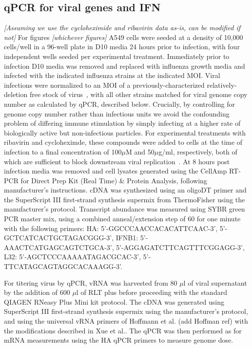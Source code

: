 \documentclass[9pt,lineno]{elife}
\newcommand{\abrcomment}[1]{\emph{\color{blue} [#1]}}
\begin{document}
\subsection{qPCR for viral genes and IFN}
\abrcomment{Assuming we use the cycloheximide and ribavirin data as-is, can be modified if not}
For figures \abrcomment{whichever figures} A549 cells were seeded at a density of 10,000 cells/well in a 96-well plate in D10 media 24 hours prior to infection, with four independent wells seeded per experimental treatment. 
Immediately prior to infection D10 media was removed and replaced with influenza growth media and infected with the indicated influenza strains at the indicated MOI.
Viral infections were normalized to an MOI of a previously-characterized relatively-deletion free stock of virus~\citep{russell2018extreme}, with all other strains matched for viral genome copy number as calculated by qPCR, described below.
Crucially, by controlling for genome copy number rather than infectious units we avoid the confounding problem of differing immune stimulation by simply infecting at a higher rate of biologically active but non-infectious particles.
For experimental treatments with ribavirin and cycloheximde, these compounds were added to cells at the time of infection to a final concentration of 100$\mu$M and 50$\mu$g/ml, respectively, both of which are sufficient to block downstream viral replication~\citep{Vanderlinden:2016ec,Reuther:2015ef,Scholtissek:1976wg,killip2014activation}.
At 8 hours post infection media was removed and cell lysates generated using the CellAmp RT-PCR for Direct Prep Kit (Real Time) \& Protein Analysis, following manufacturer's instructions. 
cDNA was synthesized using an oligoDT primer and the SuperScript III first-strand synthesis supermix from ThermoFisher using the manufacturer's protocol. 
Transcript abundance was measured using SYBR green PCR master mix, using a combined anneal/extension step of 60 for one minute with the following primers: HA: 5'-GGCCCAACCACACATTCAAC-3', 5'-GCTCATCACTGCTAGACGGG-3', IFNB1: 5'-AAACTCATGAGCAGTCTGCA-3', 5'-AGGAGATCTTCAGTTTCGGAGG-3', L32: 5'-AGCTCCCAAAAATAGACGCAC-3', 5'-TTCATAGCAGTAGGCACAAAGG-3'. 

For titering virus by qPCR, vRNA was harvested from 80 $\mu$l of viral supernatant by the addition of 600 $\mu$l of RLT plus before proceeding with the standard QIAGEN RNeasy Plus Mini kit protocol. 
The cDNA was generated using SuperScript III first-strand synthesis supermix using the manufacturer's protocol, and using the universal vRNA primers of Hoffmann et al. (add Hoffman ref) with the modifications described in Xue et al.\citep{Xue:2017dla}. 
The qPCR was then performed as for mRNA measurements using the HA qPCR primers to measure genome dose. 
\end{document}
